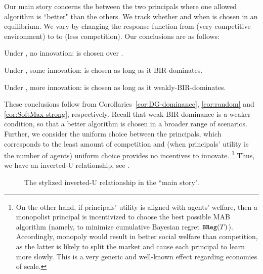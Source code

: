 Our main story concerns the \FiniteGame between the two principals where one allowed algorithm \alg is ``better" than the others. {We track whether and when \alg is chosen in an equilibrium.} We vary \competitiveness by changing the response function from \HardMax (very competitive environment) to \HardMaxRandom to  \SoftMaxRandom (less competition). Our conclusions are as follows:
\begin{OneLiners}
\item Under \HardMax, no innovation: \DynGreedy is chosen over \alg.
\item Under \HardMaxRandom, some innovation:  \alg is chosen as long as it BIR-dominates.
\item Under \SoftMaxRandom, more innovation: \alg is chosen as long as it weakly-BIR-dominates.%
\end{OneLiners}
These conclusions follow from Corollaries~\ref{cor:DG-dominance}, \ref{cor:random} and \ref{cor:SoftMax-strong}, respectively. Recall that weak-BIR-dominance is a weaker condition, so that a better algorithm is chosen in a broader range of scenarios. Further, {we consider the uniform choice between the principals, which corresponds to the least amount of competition and (when principals' utility is the number of agents) uniform choice provides no incentives to innovate.}%
\footnote{On the other hand, if principals' utility is aligned with agents' welfare, then a monopolist principal is incentivized to choose the best possible MAB algorithm (namely, to minimize cumulative Bayesian regret $\mathtt{BReg}(T)$). Accordingly, monopoly would result in better social welfare than competition, as the latter is likely to split the market and cause each principal to learn more slowly. This is a very generic and well-known effect regarding economies of scale.}
Thus, we have an inverted-U relationship, see .


\begin{figure}[t]
\begin{center}

\caption{The stylized inverted-U relationship in the ``main story".}
\label{fig:inverted-U2}
\end{center}
\end{figure}

